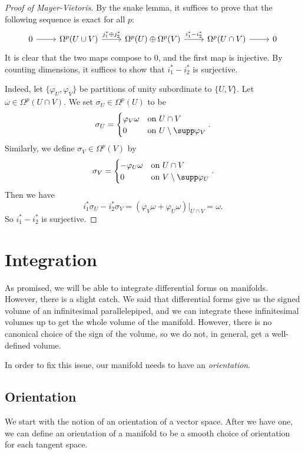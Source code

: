 \documentclass[a4paper]{article}
\begin{document}
\begin{proof}[Proof of Mayer-Vietoris]
  By the snake lemma, it suffices to prove that the following sequence is exact for all $p$:
  \[
    \begin{tikzcd}
      0 \ar[r] & \Omega^p(U \cup V) \ar[r, "j_1^* \oplus j_2^*"] & \Omega^p(U) \oplus \Omega^p(V) \ar[r, "i_1^* - i_2^*"] & \Omega^p(U \cap V) \ar[r] & 0
    \end{tikzcd}
  \]
  It is clear that the two maps compose to $0$, and the first map is injective. By counting dimensions, it suffices to show that $i_1^* - i_2^*$ is surjective.

  Indeed, let $\{\varphi_U, \varphi_V\}$ be partitions of unity subordinate to $\{U, V\}$. Let $\omega \in \Omega^p(U \cap V)$. We set $\sigma_U \in \Omega^p(U)$ to be
  \[
    \sigma_U =
    \begin{cases}
      \varphi_V \omega & \text{on }U \cap V\\
      0 & \text{on }U \setminus \supp \varphi_V
    \end{cases}.
  \]
  Similarly, we define $\sigma_V \in \Omega^p(V)$ by
  \[
    \sigma_V =
    \begin{cases}
      -\varphi_U \omega & \text{on }U \cap V\\
      0 & \text{on }V \setminus \supp \varphi_U
    \end{cases}.
  \]
  Then we have
  \[
    i_1^* \sigma_U - i_2^* \sigma_V = (\varphi_V \omega + \varphi_U \omega)|_{U \cap V} = \omega.
  \]
  So $i_1^* - i_2^*$ is surjective.
\end{proof}

\section{Integration}
As promised, we will be able to integrate differential forms on manifolds. However, there is a slight catch. We said that differential forms give us the signed volume of an infinitesimal parallelepiped, and we can integrate these infinitesimal volumes up to get the whole volume of the manifold. However, there is no canonical choice of the sign of the volume, so we do not, in general, get a well-defined volume.

In order to fix this issue, our manifold needs to have an \emph{orientation}.

\subsection{Orientation}
We start with the notion of an orientation of a vector space. After we have one, we can define an orientation of a manifold to be a smooth choice of orientation for each tangent space.
\end{document}

